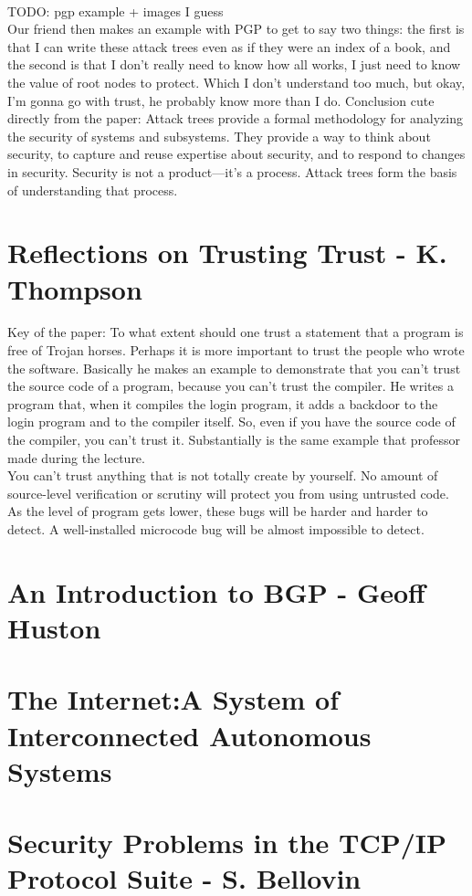 \\
TODO: pgp example + images I guess
\\
Our friend then makes an example with PGP to get to say two things: the first is that I can write these attack trees even as if they were an index of a book, and the second is that I don’t really need to know how all works, I just need to know the value of root nodes to protect. Which I don’t understand too much, but okay, I’m gonna go with trust, he probably know more than I do.
Conclusion cute directly from the paper:  
Attack trees provide a formal methodology for analyzing the security of systems and subsystems.
They provide a way to think about security, to capture and reuse expertise about security, and to
respond to changes in security. Security is not a product—it’s a process. Attack trees form the basis
of understanding that process.
\section{Reflections on Trusting Trust - K. Thompson}\label{section:Trust}
Key of the paper: To what extent should one trust a statement that a program is free of Trojan horses. Perhaps it is more important to trust the people who wrote the software.
Basically he makes an example to demonstrate that you can't trust the source code of a program, because you can't trust the compiler. He writes a program that, when it compiles the login program, it adds a backdoor to the login program and to the compiler itself. So, even if you have the source code of the compiler, you can't trust it. Substantially is the same example that professor made during the lecture.
\\You can't trust anything that is not totally create by yourself. No amount of source-level verification or scrutiny will protect you from using untrusted code. As the level of program gets lower, these bugs will be harder and harder to detect. A well-installed microcode bug will be almost impossible to detect.
\section{An Introduction to BGP - Geoff Huston}\label{section:BGP}
\section{The Internet:A System of Interconnected Autonomous Systems}\label{section:Internet}
\section{Security Problems in the TCP/IP Protocol Suite - S. Bellovin}\label{section:SecurityTCP}

